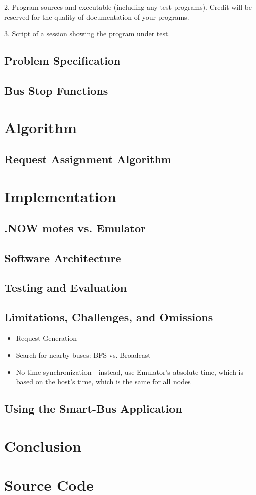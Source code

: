 \documentclass[runningheads]{llncs}
\begin{document}
2. Program sources and executable (including any test programs). Credit will be reserved for the quality of documentation of your programs.

3. Script of a session showing the program under test.

\subsection{Problem Specification}
\subsection{Bus Stop Functions}

\section{Algorithm}
\subsection{Request Assignment Algorithm}

\section{Implementation}
\subsection{.NOW motes vs. Emulator}
\subsection{Software Architecture}
\subsection{Testing and Evaluation}
\subsection{Limitations, Challenges, and Omissions}
\begin{itemize}
  \item Request Generation
  \item Search for nearby buses: BFS vs. Broadcast
  \item No time synchronization---instead, use Emulator's absolute time, which is based on the host's time, which is the same for all nodes
\end{itemize}
\subsection{Using the Smart-Bus Application}

\section{Conclusion}

\newpage
\appendix
\section{Source Code}

% 
\end{document}
